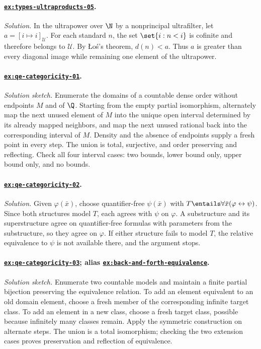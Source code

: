 \paragraph{\hyperref[ex:types-ultraproducts-05]{\texttt{ex:types-ultraproducts-05}}.}
\textit{Solution.}  In the ultrapower over \(\N\) by a nonprincipal
ultrafilter, let \(a=[i\mapsto i]_{\mathcal U}\).  For each standard \(n\),
the set \(\set{i:n<i}\) is cofinite and therefore belongs to
\(\mathcal U\).  By \L{}o\'s's theorem, \(d(n)<a\).  Thus \(a\) is greater
than every diagonal image while remaining one element of the ultrapower.

\paragraph{\hyperref[ex:qe-categoricity-01]{\texttt{ex:qe-categoricity-01}}.}
\textit{Solution sketch.}  Enumerate the domains of a countable dense order
without endpoints \(M\) and of \(\Q\).  Starting from the empty partial
isomorphism, alternately map the next unused element of \(M\) into the unique
open interval determined by its already mapped neighbors, and map the next
unused rational back into the corresponding interval of \(M\).  Density and
the absence of endpoints supply a fresh point in every step.  The union is
total, surjective, and order preserving and reflecting.  Check all four interval
cases: two bounds, lower bound only, upper bound only, and no bounds.

\paragraph{\hyperref[ex:qe-categoricity-02]{\texttt{ex:qe-categoricity-02}}.}
\textit{Solution.}  Given \(\varphi(\bar x)\), choose quantifier-free
\(\psi(\bar x)\) with
\(T\entails\forall\bar x(\varphi\leftrightarrow\psi)\).  Since both
structures model \(T\), each agrees with \(\psi\) on \(\varphi\).  A
substructure and its superstructure agree on quantifier-free formulas with
parameters from the substructure, so they agree on \(\varphi\).  If either
structure fails to model \(T\), the relative equivalence to \(\psi\) is not
available there, and the argument stops.

\paragraph{\hyperref[ex:qe-categoricity-03]{\texttt{ex:qe-categoricity-03}};
alias \hyperref[ex:back-and-forth-equivalence]{\texttt{ex:back-and-forth-equivalence}}.}
\textit{Solution sketch.}  Enumerate two countable models and maintain a finite
partial bijection preserving the equivalence relation.  To add an element
equivalent to an old domain element, choose a fresh member of the corresponding
infinite target class.  To add an element in a new class, choose a fresh target
class, possible because infinitely many classes remain.  Apply the symmetric
construction on alternate steps.  The union is a total isomorphism; checking
the two extension cases proves preservation and reflection of equivalence.


